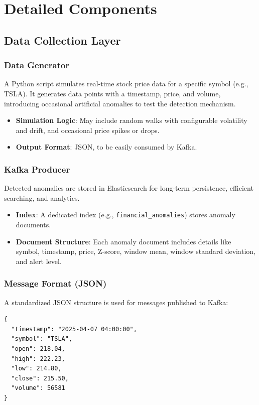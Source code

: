 \section{Detailed Components}

\subsection{Data Collection Layer}

\subsubsection{Data Generator}

A Python script simulates real-time stock price data for a specific symbol (e.g., TSLA). It generates data points with a timestamp, price, and volume, introducing occasional artificial anomalies to test the detection mechanism.
\begin{itemize}
    \item \textbf{Simulation Logic}: May include random walks with configurable volatility and drift, and occasional price spikes or drops.
    \item \textbf{Output Format}: JSON, to be easily consumed by Kafka.
\end{itemize}

\subsubsection{Kafka Producer}

Detected anomalies are stored in Elasticsearch for long-term persistence, efficient searching, and analytics.
\begin{itemize}
    \item \textbf{Index}: A dedicated index (e.g., \texttt{financial\_anomalies}) stores anomaly documents.
    \item \textbf{Document Structure}: Each anomaly document includes details like symbol, timestamp, price, Z-score, window mean, window standard deviation, and alert level.
\end{itemize}
\subsubsection{Message Format (JSON)}

A standardized JSON structure is used for messages published to Kafka:
\begin{verbatim}
{
  "timestamp": "2025-04-07 04:00:00",
  "symbol": "TSLA",
  "open": 218.04,
  "high": 222.23,
  "low": 214.80,
  "close": 215.50,
  "volume": 56581
}

\end{verbatim}

